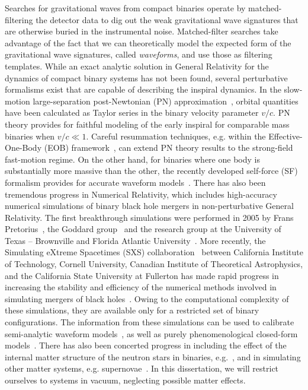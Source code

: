 Searches for gravitational waves from compact binaries operate by 
matched-filtering the detector data to dig out the weak gravitational wave
signatures that are otherwise buried in the instrumental noise. 
Matched-filter searches take
advantage of the fact that we can theoretically model the expected form of the 
gravitational wave signatures, called \textit{waveforms}, and use those 
as filtering templates. While an exact analytic solution in General Relativity
for the dynamics of compact binary systems has not been found, several perturbative
formalisms exist that are capable of describing the inspiral dynamics.
In the slow-motion large-separation post-Newtonian (PN) 
approximation~\cite{PNtheoryLivingReviewBlanchet}, orbital quantities have 
been calculated as Taylor series in the binary 
velocity parameter $v/c$. PN theory provides for faithful modeling of the 
early inspiral for comparable mass binaries when $v/c\ll 1$. 
Careful resummation techniques, e.g. within the Effective-One-Body
(EOB) framework~\cite{EOBOriginalBuonannoDamour}, can extend PN theory 
results to the strong-field fast-motion regime.
On the other hand, for binaries where one body is substantially more massive
than the other, the recently developed self-force (SF) formalism provides for
accurate waveform models~\cite{grallaI,grallaII}. 
% 
There has also been tremendous progress in Numerical Relativity, which 
includes high-accuracy numerical simulations of binary black
hole mergers in non-perturbative General Relativity. The first breakthrough
simulations were performed in 2005 by Frans Pretorius~\cite{Pretorius2005,
Pretorius2006}, the Goddard group~\cite{Campanelli:2005dd} and the research
group at the University of Texas -- Brownville and Florida Atlantic 
University~\cite{Campanelli:2005dd}. More recently, the Simulating eXtreme
Spacetimes (SXS) collaboration~\cite{SXSWebsite} between California Institute
of Technology, Cornell University, Canadian Institute of Theoretical 
Astrophysics, and the California State University at Fullerton has made rapid
progress in increasing the stability and efficiency of the numerical 
methods involved in simulating mergers of black holes~\cite{Mroue:2013xna}.
Owing to the computational complexity of these simulations, they are available 
only for a restricted set of binary configurations. 
The information from these simulations can be used to calibrate
semi-analytic waveform models~\cite{BuonannoEOBv2Main}, as well as purely
phenomenological closed-form models~\cite{Santamaria:2010yb}. 
There has also been concerted progress in including the effect of the 
internal matter structure of the neutron stars in binaries, 
e.g.~\cite{Deaton:2013sla}, and in simulating other matter systems,
e.g. supernovae~\cite{Mosta:2014jaa}.
In this dissertation, we will restrict ourselves to systems in vacuum, 
neglecting possible matter effects. 

